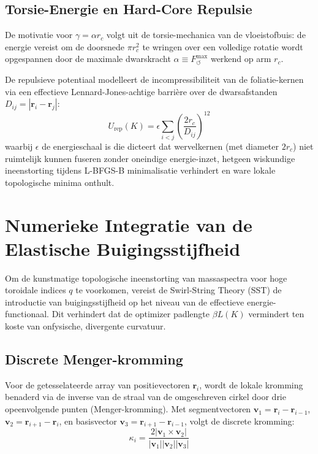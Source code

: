 \documentclass[12pt,a4paper]{article}
\begin{document}
\subsection*{Torsie-Energie en Hard-Core Repulsie}
De motivatie voor $\gamma = \alpha r_c$ volgt uit de torsie-mechanica van de vloeistofbuis: de energie vereist om de doorsnede $\pi r_c^2$ te wringen over een volledige rotatie wordt opgespannen door de maximale dwarskracht $\alpha \equiv F_{\!\boldsymbol{\circlearrowleft}}^{\max}$ werkend op arm $r_c$.

De repulsieve potentiaal modelleert de incompressibiliteit van de foliatie-kernen via een effectieve Lennard-Jones-achtige barri\`ere over de dwarsafstanden $D_{ij} = |\mathbf{r}_i - \mathbf{r}_j|$:
\begin{equation}
    U_{\text{rep}}(K) = \epsilon \sum_{i < j} \left( \frac{2r_c}{D_{ij}} \right)^{12}
\end{equation}
waarbij $\epsilon$ de energieschaal is die dicteert dat wervelkernen (met diameter $2r_c$) niet ruimtelijk kunnen fuseren zonder oneindige energie-inzet, hetgeen wiskundige ineenstorting tijdens L-BFGS-B minimalisatie verhindert en ware lokale topologische minima onthult.


\section*{Numerieke Integratie van de Elastische Buigingsstijfheid}

Om de kunstmatige topologische ineenstorting van massaspectra voor hoge toroidale indices $q$ te voorkomen, vereist de Swirl-String Theory (SST) de introductie van buigingsstijfheid op het niveau van de effectieve energie-functionaal. Dit verhindert dat de optimizer padlengte $\beta L(K)$ vermindert ten koste van onfysische, divergente curvatuur.

\subsection*{Discrete Menger-kromming}
Voor de getesselateerde array van positievectoren $\mathbf{r}_i$, wordt de lokale kromming benaderd via de inverse van de straal van de omgeschreven cirkel door drie opeenvolgende punten (Menger-kromming). Met segmentvectoren $\mathbf{v}_1 = \mathbf{r}_i - \mathbf{r}_{i-1}$, $\mathbf{v}_2 = \mathbf{r}_{i+1} - \mathbf{r}_i$, en basisvector $\mathbf{v}_3 = \mathbf{r}_{i+1} - \mathbf{r}_{i-1}$, volgt de discrete kromming:
\begin{equation}
    \kappa_i = \frac{2|\mathbf{v}_1 \times \mathbf{v}_2|}{|\mathbf{v}_1| |\mathbf{v}_2| |\mathbf{v}_3|}
\end{equation}
\end{document}
